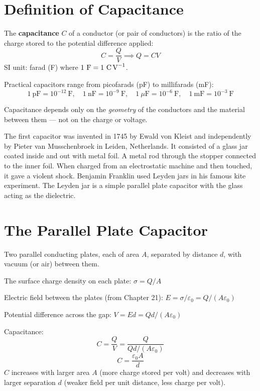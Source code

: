 \section{Definition of Capacitance}

\begin{definitionbox}[Capacitance]
The \textbf{capacitance} $C$ of a conductor (or pair
of conductors) is the ratio of the charge stored to
the potential difference applied:
\[
  C = \frac{Q}{V}
  \implies Q = CV
\]
SI unit: farad (F) where $1\ \text{F}
= 1\ \text{C\,V}^{-1}$.

Practical capacitors range from picofarads (pF)
to millifarads (mF):
\[
  1\ \text{pF} = 10^{-12}\ \text{F},\quad
  1\ \text{nF} = 10^{-9}\ \text{F},\quad
  1\ \mu\text{F} = 10^{-6}\ \text{F},\quad
  1\ \text{mF} = 10^{-3}\ \text{F}
\]

Capacitance depends only on the \textit{geometry}
of the conductors and the material between them ---
not on the charge or voltage.
\end{definitionbox}

\begin{historybox}
The first capacitor was invented in 1745 by Ewald
von Kleist and independently by Pieter van Musschenbroek
in Leiden, Netherlands. It consisted of a glass jar
coated inside and out with metal foil. A metal rod
through the stopper connected to the inner foil.
When charged from an electrostatic machine and then
touched, it gave a violent shock. Benjamin Franklin
used Leyden jars in his famous kite experiment.
The Leyden jar is a simple parallel plate capacitor
with the glass acting as the dielectric.
\end{historybox}

\section{The Parallel Plate Capacitor}

\begin{processbox}
Two parallel conducting plates, each of area $A$,
separated by distance $d$, with vacuum (or air)
between them.

The surface charge density on each plate:
$\sigma = Q/A$

Electric field between the plates (from Chapter 21):
$E = \sigma/\varepsilon_0 = Q/(A\varepsilon_0)$

Potential difference across the gap:
$V = Ed = Qd/(A\varepsilon_0)$

Capacitance:
\[
  C = \frac{Q}{V} = \frac{Q}{Qd/(A\varepsilon_0)}
\]
\[
  \boxed{C = \frac{\varepsilon_0 A}{d}}
\]
$C$ increases with larger area $A$ (more charge
stored per volt) and decreases with larger separation
$d$ (weaker field per unit distance, less charge
per volt).
\end{processbox}

